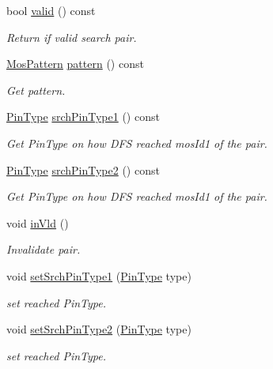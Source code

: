 \begin{DoxyCompactItemize}
bool \hyperlink{classMosPair_a16696e5a4fa38118f88549dfc782ac22}{valid} () const
\begin{DoxyCompactList}\small\item\em Return if valid search pair. \end{DoxyCompactList}\item 
\hyperlink{type_8h_af19eddb079bfea723256710b029c38e8}{Mos\+Pattern} \hyperlink{classMosPair_a342efc591b339fc9d08ad468d7399dd9}{pattern} () const
\begin{DoxyCompactList}\small\item\em Get pattern. \end{DoxyCompactList}\item 
\hyperlink{type_8h_afaab50027002ecbb6c8ac27e727d1bb4}{Pin\+Type} \hyperlink{classMosPair_ad0de45e3e866860a50715a01edcd4422}{srch\+Pin\+Type1} () const
\begin{DoxyCompactList}\small\item\em Get Pin\+Type on how D\+FS reached mos\+Id1 of the pair. \end{DoxyCompactList}\item 
\hyperlink{type_8h_afaab50027002ecbb6c8ac27e727d1bb4}{Pin\+Type} \hyperlink{classMosPair_aae7ff1f0f5a50dd2d849e00a3de2225a}{srch\+Pin\+Type2} () const
\begin{DoxyCompactList}\small\item\em Get Pin\+Type on how D\+FS reached mos\+Id1 of the pair. \end{DoxyCompactList}\item 
void \hyperlink{classMosPair_a3064a984676f0bd8e6d380a050bd2152}{in\+Vld} ()
\begin{DoxyCompactList}\small\item\em Invalidate pair. \end{DoxyCompactList}\item 
void \hyperlink{classMosPair_a68fce010dca21d0834db83f8b8c0be0d}{set\+Srch\+Pin\+Type1} (\hyperlink{type_8h_afaab50027002ecbb6c8ac27e727d1bb4}{Pin\+Type} type)
\begin{DoxyCompactList}\small\item\em set reached Pin\+Type. \end{DoxyCompactList}\item 
void \hyperlink{classMosPair_a0a6573b1ad04183fde75d60c887f9a9b}{set\+Srch\+Pin\+Type2} (\hyperlink{type_8h_afaab50027002ecbb6c8ac27e727d1bb4}{Pin\+Type} type)
\begin{DoxyCompactList}\small\item\em set reached Pin\+Type. \end{DoxyCompactList}\item 

\end{DoxyCompactItemize}
